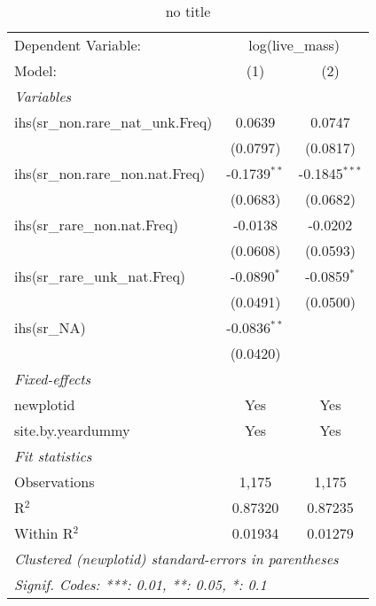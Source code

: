 
\begin{table}[htbp]
   \caption{no title}
   \centering
   \begin{tabular}{lcc}
      \tabularnewline \midrule \midrule
      Dependent Variable: & \multicolumn{2}{c}{log(live\_mass)}\\
      Model:                              & (1)            & (2)\\  
      \midrule
      \emph{Variables}\\
      ihs(sr\_non.rare\_nat\_unk.Freq)    & 0.0639         & 0.0747\\   
                                          & (0.0797)       & (0.0817)\\   
      ihs(sr\_non.rare\_non.nat.Freq)     & -0.1739$^{**}$ & -0.1845$^{***}$\\   
                                          & (0.0683)       & (0.0682)\\   
      ihs(sr\_rare\_non.nat.Freq)         & -0.0138        & -0.0202\\   
                                          & (0.0608)       & (0.0593)\\   
      ihs(sr\_rare\_unk\_nat.Freq)        & -0.0890$^{*}$  & -0.0859$^{*}$\\   
                                          & (0.0491)       & (0.0500)\\   
      ihs(sr\_NA)                         & -0.0836$^{**}$ &   \\   
                                          & (0.0420)       &   \\   
      \midrule
      \emph{Fixed-effects}\\
      newplotid                           & Yes            & Yes\\  
      site.by.yeardummy                   & Yes            & Yes\\  
      \midrule
      \emph{Fit statistics}\\
      Observations                        & 1,175          & 1,175\\  
      R$^2$                               & 0.87320        & 0.87235\\  
      Within R$^2$                        & 0.01934        & 0.01279\\  
      \midrule \midrule
      \multicolumn{3}{l}{\emph{Clustered (newplotid) standard-errors in parentheses}}\\
      \multicolumn{3}{l}{\emph{Signif. Codes: ***: 0.01, **: 0.05, *: 0.1}}\\
   \end{tabular}
\end{table}


